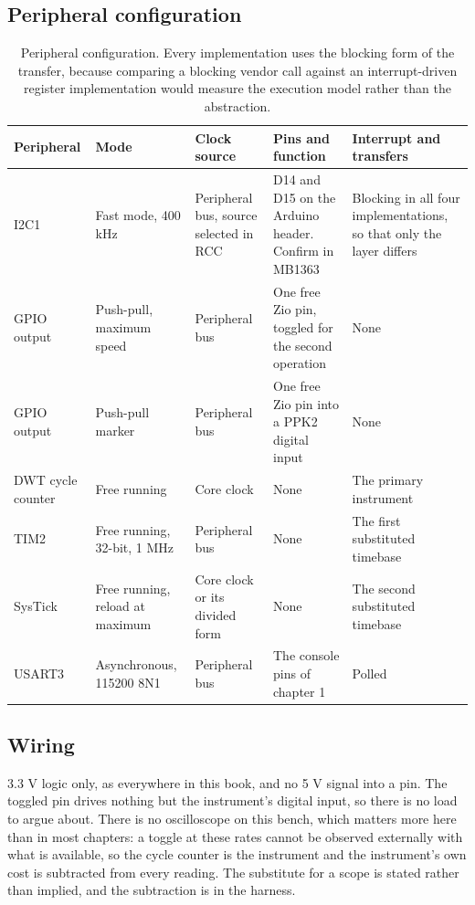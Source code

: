 \subsection*{Peripheral configuration}

\begin{table}[H]\centering\small
\begin{tabular}{p{22mm}p{26mm}p{24mm}p{30mm}p{30mm}}
\toprule
Peripheral & Mode & Clock source & Pins and function & Interrupt and transfers \\
\midrule
I2C1 & Fast mode, 400 kHz & Peripheral bus, source selected in RCC & D14 and D15 on the Arduino header. Confirm in MB1363 & Blocking in all four implementations, so that only the layer differs \\
GPIO output & Push-pull, maximum speed & Peripheral bus & One free Zio pin, toggled for the second operation & None \\
GPIO output & Push-pull marker & Peripheral bus & One free Zio pin into a PPK2 digital input & None \\
DWT cycle counter & Free running & Core clock & None & The primary instrument \\
TIM2 & Free running, 32-bit, 1 MHz & Peripheral bus & None & The first substituted timebase \\
SysTick & Free running, reload at maximum & Core clock or its divided form & None & The second substituted timebase \\
USART3 & Asynchronous, 115200 8N1 & Peripheral bus & The console pins of chapter 1 & Polled \\
\bottomrule
\end{tabular}
\caption{Peripheral configuration. Every implementation uses the blocking form of the transfer, because comparing a blocking vendor call against an interrupt-driven register implementation would measure the execution model rather than the abstraction.}
\end{table}

\subsection*{Wiring}


3.3 V logic only, as everywhere in this book, and no 5 V signal into a pin. The
toggled pin drives nothing but the instrument's digital input, so there is no
load to argue about. There is no oscilloscope on this bench, which matters more
here than in most chapters: a toggle at these rates cannot be observed
externally with what is available, so the cycle counter is the instrument and
the instrument's own cost is subtracted from every reading. The substitute for a
scope is stated rather than implied, and the subtraction is in the harness.

